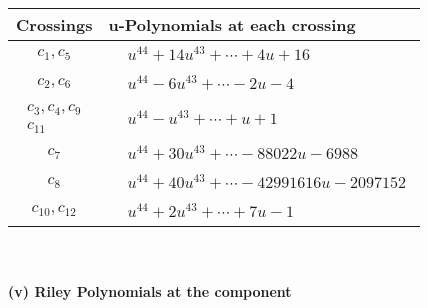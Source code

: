 \documentclass[1p]{elsarticle_modified}
\theoremstyle{definition}
\begin{document}
\begin{tabular}{m{50pt}|m{274pt}}
Crossings & \hspace{64pt}u-Polynomials at each crossing \\
\hline $$\begin{aligned}c_{1},c_{5}\end{aligned}$$&$\begin{aligned}
&u^{44}+14 u^{43}+\cdots+4 u+16
\end{aligned}$\\
\hline $$\begin{aligned}c_{2},c_{6}\end{aligned}$$&$\begin{aligned}
&u^{44}-6 u^{43}+\cdots-2 u-4
\end{aligned}$\\
\hline $$\begin{aligned}c_{3},c_{4},c_{9}\\c_{11}\end{aligned}$$&$\begin{aligned}
&u^{44}- u^{43}+\cdots+u+1
\end{aligned}$\\
\hline $$\begin{aligned}c_{7}\end{aligned}$$&$\begin{aligned}
&u^{44}+30 u^{43}+\cdots-88022 u-6988
\end{aligned}$\\
\hline $$\begin{aligned}c_{8}\end{aligned}$$&$\begin{aligned}
&u^{44}+40 u^{43}+\cdots-42991616 u-2097152
\end{aligned}$\\
\hline $$\begin{aligned}c_{10},c_{12}\end{aligned}$$&$\begin{aligned}
&u^{44}+2 u^{43}+\cdots+7 u-1
\end{aligned}$\\
\hline
\end{tabular}\\~\\
\newpage\renewcommand{\arraystretch}{1}
\flushleft \textbf{(v) Riley Polynomials at the component}\newline \\
\end{document}
